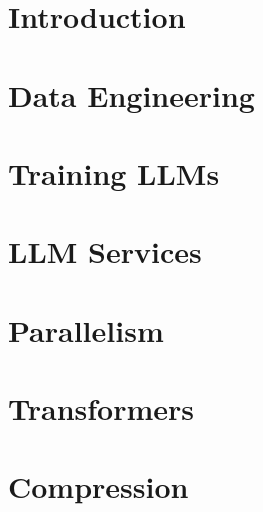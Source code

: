 \documentclass[oneside, a4paper,11pt]{book}
\begin{document}
\mainmatter
\part{Introduction}


\part{Data Engineering}

\part{Training LLMs}


\part{LLM Services}

\part{Parallelism}

\part{Transformers}

\part{Compression}


\backmatter

\nocite{*}


\end{document}
